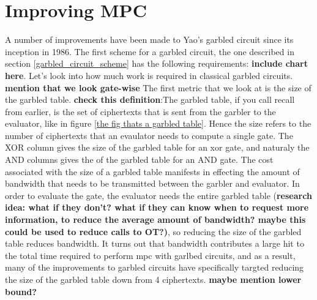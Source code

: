 \chapter{Improving MPC}
A number of improvements have been made to Yao's garbled circuit since its inception in 1986.
The first scheme for a garbled circuit, the one described in section \ref{garbled_circuit_scheme} has the following requirements: \textbf{include chart here}.
Let's look into how much work is required in classical garbled circuits.
\textbf{mention that we look gate-wise}
The first metric that we look at is the size of the garbled table.
\textbf{check this definition}:The garbled table, if you call recall from earlier, is the set of ciphertexts that is sent from the garbler to the evaluator, like in figure \ref{the fig thats a garbled table}.
Hence the size refers to the number of ciphertexts that an evaulator needs to compute a single gate.
The XOR column gives the size of the garbled table for an xor gate, and naturaly the AND columns gives the of the garbled table for an AND gate.
The cost associated with the size of a garbled table manifests in effecting the amount of bandwidth that needs to be transmitted between the garbler and evaluator.
In order to evaluate the gate, the evaluator needs the entire garbled table (\textbf{research idea: what if they don't? what if they can know when to request more information, to reduce the average amount of bandwidth? maybe this could be used to reduce calls to OT?)}, so reducing the size of the garbled table reduces bandwidth.
It turns out that bandwidth contributes a large hit to the total time required to perform mpc with garlbed circuits, and as a result, many of the improvements to garbled circuits have specifically targted reducing the size of the garbled table down from 4 ciphertexts.
\textbf{maybe mention lower bound?}

